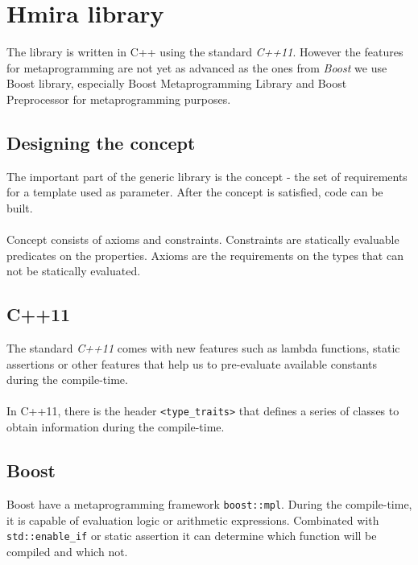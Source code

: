 \chapter{Hmira library}

The library is written in C++ using the standard \emph{C++11}\cite{Naugler2013}. However the features
for metaprogramming are not yet as advanced as the ones from \emph{Boost}\cite{Abrahams2004} we
use Boost library, especially Boost Metaprogramming Library and Boost Preprocessor for
metaprogramming purposes.

\section{Designing the concept}

The important part of the generic library is the concept - the set of requirements for a template
used as parameter. After the concept is satisfied, code can be built.\\
\\
Concept consists of axioms and constraints\cite{Sutton2012}. Constraints are statically evaluable
predicates on the properties. Axioms are the requirements on the types that can not be statically
evaluated.

\section{C++11}

The standard \emph{C++11} comes with new features such as lambda functions, static assertions or other
features that help us to pre-evaluate available constants during the compile-time.\\
\\
In C++11, there is the header \texttt{\textless type\_traits\textgreater} that defines
a series of classes to obtain information during the compile-time.

\section{Boost}

Boost have a metaprogramming framework \texttt{boost::mpl}. During the compile-time, it is
capable of evaluation logic or arithmetic expressions. Combinated with \texttt{std::enable\_if}
or static assertion it can determine which function will be compiled and which not.